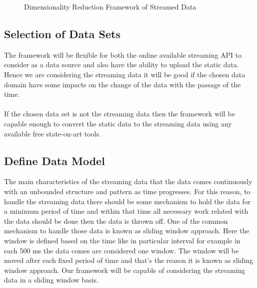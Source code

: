 \begin{figure}[htbp]
	\centering
	
	
	\caption{Dimensionality Reduction Framework of Streamed Data}
	\label{fig:labelOfThesisFlowChart}
\end{figure}
\subsection{Selection of Data Sets}
The framework will be flexible for both the online available streaming API to consider as a data source and also have the ability to upload the static data. Hence we are considering the streaming data it will be good if the chosen data domain have some impacts on the change of the data with the passage of the time.\\\\
If the chosen data set is not the streaming data then the framework will be capable enough to convert the static data to the streaming data using any available free state-on-art tools.
\subsection{Define Data Model}
The main characteristics of the streaming data that the data comes continuously with an unbounded structure and pattern as time progresses. For this reason, to handle the streaming data there should be some mechanism to hold the data for a minimum period of time and within that time all necessary work related with the data should be done then the data is thrown off. One of the common mechanism to handle those data is known as sliding window approach. Here the window is defined based on the time like in particular interval for example in each 500 ms the data comes are considered one window. The window will be moved after each fixed period of time and that's the reason it is known as sliding window approach. Our framework will be capable of considering the streaming data in a sliding window basis.
